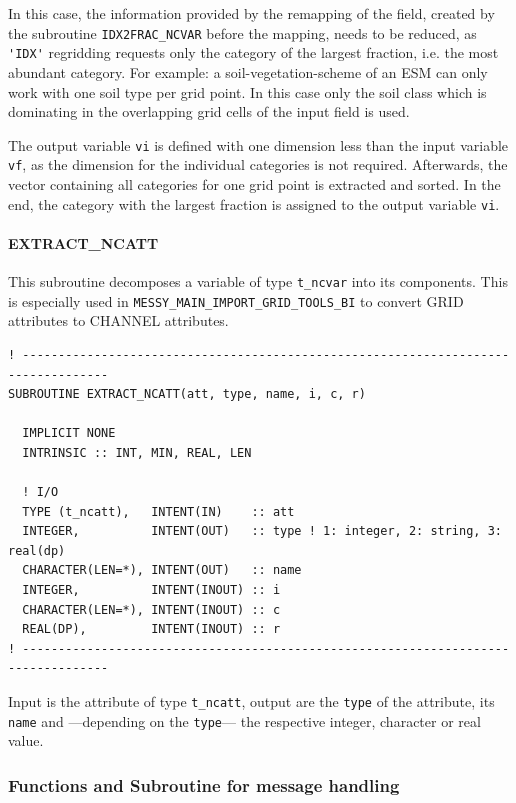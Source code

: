 \documentclass[11pt,twoside]{article}
\begin{document}
 In this case, the information provided by the remapping of
the field, created by the subroutine \verb|IDX2FRAC_NCVAR| before the
mapping, needs to be reduced,
as \verb|'IDX'| regridding requests only the category of the 
largest fraction, i.e. the most abundant category.
For example: a soil-vegetation-scheme of an ESM can only work with one soil
type per grid point. In this case only the soil class which is
dominating in the overlapping grid cells of the input field is used.

The output variable
 \verb|vi| is defined with one dimension less than the input
 variable \verb|vf|, as the dimension for the individual categories is
 not required. 
Afterwards, the vector containing all categories for one grid point is extracted
and sorted. In the end, the category with the largest fraction is assigned to
the output variable \verb|vi|. 


\paragraph{EXTRACT\_NCATT\\ \label{EXTATT}}

This subroutine decomposes a variable of type \verb|t_ncvar| into its 
components. This is especially used in 
\verb|MESSY_MAIN_IMPORT_GRID_TOOLS_BI| to convert GRID attributes to 
CHANNEL attributes.
\begin{verbatim}
! ----------------------------------------------------------------------------------
SUBROUTINE EXTRACT_NCATT(att, type, name, i, c, r)

  IMPLICIT NONE
  INTRINSIC :: INT, MIN, REAL, LEN

  ! I/O
  TYPE (t_ncatt),   INTENT(IN)    :: att
  INTEGER,          INTENT(OUT)   :: type ! 1: integer, 2: string, 3: real(dp)
  CHARACTER(LEN=*), INTENT(OUT)   :: name
  INTEGER,          INTENT(INOUT) :: i
  CHARACTER(LEN=*), INTENT(INOUT) :: c
  REAL(DP),         INTENT(INOUT) :: r
! ----------------------------------------------------------------------------------
\end{verbatim}
Input is the attribute of type \verb|t_ncatt|, output are the \verb|type|
of the attribute, its \verb|name| and ---depending on the \verb|type|--- the
respective integer, character or real value.

\subsubsection{Functions and Subroutine for message handling}
\end{document}
